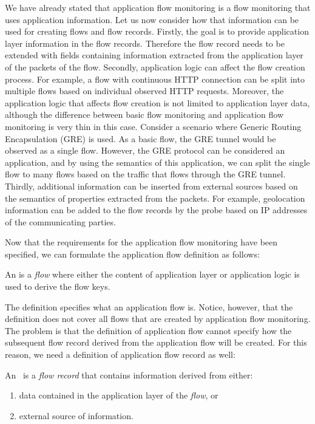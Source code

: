 We have already stated that application flow monitoring is a flow monitoring that uses application information. Let us now consider how that information can be used for creating flows and flow records. Firstly, the goal is to provide application layer information in the flow records. Therefore the flow record needs to be extended with fields containing information extracted from the application layer of the packets of the flow. Secondly, application logic can affect the flow creation process. For example, a flow with continuous HTTP connection can be split into multiple flows based on individual observed HTTP requests. Moreover, the application logic that affects flow creation is not limited to application layer data, although the difference between basic flow monitoring and application flow monitoring is very thin in this case. Consider a scenario where Generic Routing Encapsulation (GRE) is used. As a basic flow, the GRE tunnel would be observed as a single flow. However, the GRE protocol can be considered an application, and by using the semantics of this application, we can split the single flow to many flows based on the traffic that flows through the GRE tunnel. Thirdly, additional information can be inserted from external sources based on the semantics of properties extracted from the packets. For example, geolocation information can be added to the flow records by the probe based on IP addresses of the communicating parties.

Now that the requirements for the application flow monitoring have been specified, we can formulate the application flow definition as follows:

\begin{definition}\label{def:application-flow}

    An \emph{} is a \emph{flow} where either
    the content of application layer or application logic is used
    to derive the flow keys.

\end{definition}

The definition specifies what an application flow is. Notice, however, that the definition does not cover all flows that are created by application flow monitoring. The problem is that the definition of application flow cannot specify how the subsequent flow record derived from the application flow will be created. For this reason, we need a definition of application flow record as well:

\begin{definition}\label{def:application-flow-record}

    An~\emph{} is a \emph{flow record} 
    that contains information derived from either:

    \begin{enumerate}
        \item data contained in the application layer of the \emph{flow}, or
        \item external source of information.
    \end{enumerate}
        
\end{definition}

